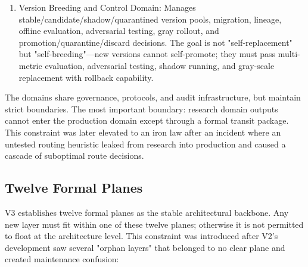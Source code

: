 \documentclass[12pt,a4paper]{article}
\begin{document}
\begin{enumerate}
  \item Version Breeding and Control Domain: Manages stable/candidate/shadow/quarantined version pools, migration, lineage, offline evaluation, adversarial testing, gray rollout, and promotion/quarantine/discard decisions. The goal is not "self-replacement" but "self-breeding"---new versions cannot self-promote; they must pass multi-metric evaluation, adversarial testing, shadow running, and gray-scale replacement with rollback capability.
\end{enumerate}

The domains share governance, protocols, and audit infrastructure, but maintain strict boundaries. The most important boundary: research domain outputs cannot enter the production domain except through a formal transit package. This constraint was later elevated to an iron law after an incident where an untested routing heuristic leaked from research into production and caused a cascade of suboptimal route decisions.

\subsection{Twelve Formal Planes}


V3 establishes twelve formal planes as the stable architectural backbone. Any new layer must fit within one of these twelve planes; otherwise it is not permitted to float at the architecture level. This constraint was introduced after V2's development saw several "orphan layers" that belonged to no clear plane and created maintenance confusion:
\end{document}
